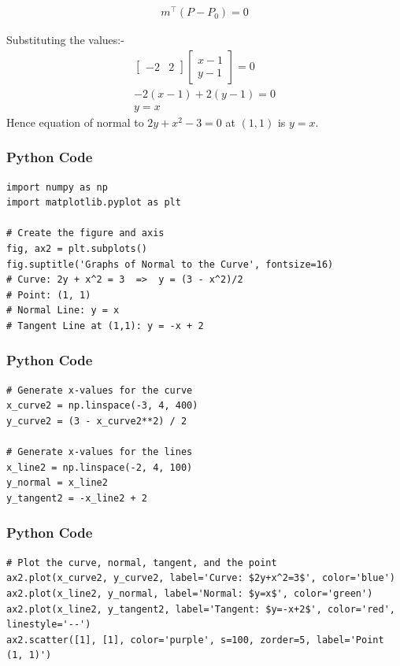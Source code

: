 \documentclass{beamer}
\begin{document}
\begin{frame}
\begin{align}
m^\top (P - P_0) = 0
\end{align}

Substituting the values:-
\begin{align}
\begin{bmatrix}-2 & 2\end{bmatrix}\begin{bmatrix}x-1 \\y-1\end{bmatrix}= 0\\
-2(x-1) + 2(y-1) = 0\\
y = x
\end{align}
Hence equation of normal to $2y + x^2 - 3 = 0$ at $(1,1)$ is $y = x$.
\end{frame}


\begin{frame}[fragile]
\frametitle{Python Code}
\begin{lstlisting}
import numpy as np
import matplotlib.pyplot as plt

# Create the figure and axis
fig, ax2 = plt.subplots()
fig.suptitle('Graphs of Normal to the Curve', fontsize=16)
# Curve: 2y + x^2 = 3  =>  y = (3 - x^2)/2
# Point: (1, 1)
# Normal Line: y = x
# Tangent Line at (1,1): y = -x + 2
\end{lstlisting}
\end{frame}

\begin{frame}[fragile]
\frametitle{Python Code}
\begin{lstlisting}
# Generate x-values for the curve
x_curve2 = np.linspace(-3, 4, 400)
y_curve2 = (3 - x_curve2**2) / 2

# Generate x-values for the lines
x_line2 = np.linspace(-2, 4, 100)
y_normal = x_line2
y_tangent2 = -x_line2 + 2
\end{lstlisting}
\end{frame}

\begin{frame}[fragile]
\frametitle{Python Code}
\begin{lstlisting}
# Plot the curve, normal, tangent, and the point
ax2.plot(x_curve2, y_curve2, label='Curve: $2y+x^2=3$', color='blue')
ax2.plot(x_line2, y_normal, label='Normal: $y=x$', color='green')
ax2.plot(x_line2, y_tangent2, label='Tangent: $y=-x+2$', color='red', linestyle='--')
ax2.scatter([1], [1], color='purple', s=100, zorder=5, label='Point (1, 1)')
\end{lstlisting}
\end{frame}
\end{document}
